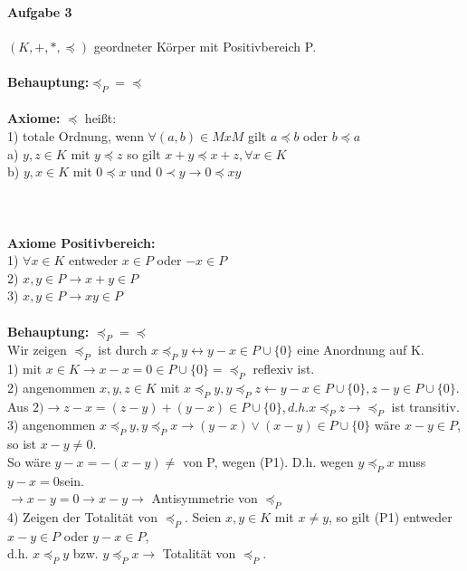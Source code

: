 \documentclass[10pt,a4paper,draft]{scrartcl}
\begin{document}
\paragraph*{Aufgabe 3}
\begin{tabbing}
$(K,+,*,\preceq)$ geordneter Körper mit Positivbereich P.\\\\
\textbf{Behauptung:}$\preceq_{P}=\preceq$\\\\

\textbf{Axiome:} $\preceq$ heißt:\\
 1) totale Ordnung, wenn $\forall (a,b)\in MxM$ gilt $a\preceq b$ oder $b\preceq a$\\
  a) $y,z\in K$ mit $y\preceq z$ so gilt $x + y\preceq x+z,\forall x\in K$\\
  b) $y,x\in K$ mit $0\preceq x$ und  $0\prec y\rightarrow 0\preceq xy$\\\\\\\\

\textbf{Axiome Positivbereich:}\\
 1) $\forall x\in K$ entweder $x\in P$ oder $-x\in P$\\
 2) $x,y\in P\rightarrow x+y\in P$\\
 3) $x,y\in P\rightarrow xy\in P$\\\\

\textbf{Behauptung:} $\preceq_{P} =\preceq$\\
Wir zeigen $\preceq_{P}$ ist durch $x\preceq_{P} y\leftrightarrow y-x\in P\cup \{0\}$ eine Anordnung auf K.\\
 1) mit $x\in K\rightarrow x-x=0\in P\cup \{0\}=\preceq_{P}$ reflexiv ist.\\
 
 2) angenommen  $x,y,z\in K$ mit $x\preceq_{P} y, y\preceq_{P} z\leftarrow y-x\in P\cup \{0\}, z-y\in P\cup\{0\}$.\\
 	Aus $2)\rightarrow z-x=(z-y)+(y-x)\in P\cup \{0\}, d.h. x\preceq_{P} z\rightarrow \preceq_{P}$ ist transitiv.\\
 
 3) angenommen $x\preceq_{P} y, y\preceq_{P} x\rightarrow (y-x)\vee (x-y)\in P\cup \{0\}$ wäre $x-y\in P$, so ist $x-y\neq 0$.\\
 So wäre $y-x=-(x-y)\neq$ von P, wegen (P1). D.h. wegen $y\preceq_{P} x$ muss $y-x=0$sein.\\
 $\rightarrow x-y=0\rightarrow x-y\rightarrow$ Antisymmetrie von $\preceq_{P}$\\
 
 4) Zeigen der Totalität von $\preceq_{P}$. Seien $x,y\in K$ mit $x\neq y$, so gilt (P1) entweder $x-y\in P$ oder $y-x\in P$,\\ d.h. $x\preceq_{P} y$ bzw. $y\preceq_{P} x\rightarrow$ Totalität von $\preceq_{P}$.\\
\end{tabbing}
\end{document}

